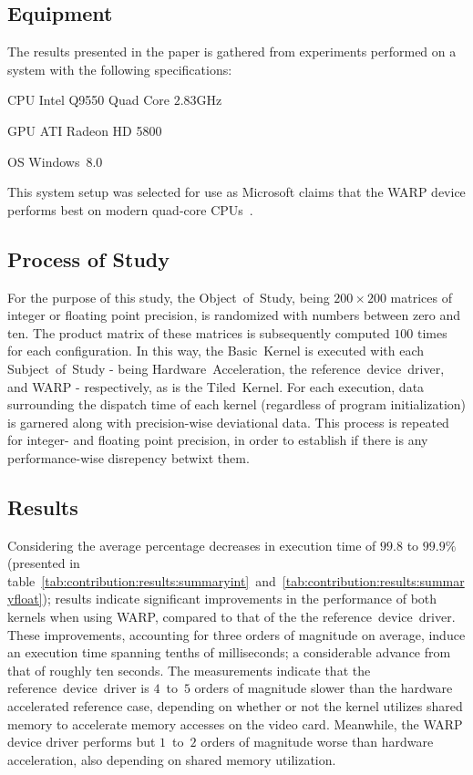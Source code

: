 \subsection{Equipment}
\label{sec:contribution:equipment}
The results presented in the paper is gathered from experiments performed on a system with the following specifications:
\begin{description*}
	\item[CPU] Intel Q9550 Quad Core $2.83$GHz
	\item[GPU] ATI Radeon HD 5800
	\item[OS\phantom{U}] Windows~8.0
\end{description*}
This system setup was selected for use as Microsoft claims that the WARP device performs best on modern quad-core CPUs~.

\subsection{Process of Study}
\label{sec:contribution:processofstudy}
For the purpose of this study, the Object~of~Study, being $200\times 200$ matrices of integer or floating point precision, is randomized with numbers between zero and ten.
The product matrix of these matrices is subsequently computed $100$ times for each configuration.
In this way, the Basic~Kernel is executed with each Subject~of~Study - being Hardware~Acceleration, the reference~device~driver, and WARP - respectively, as is the Tiled~Kernel.
For each execution, data surrounding the dispatch time of each kernel (regardless of program initialization) is garnered along with precision-wise deviational data.
This process is repeated for integer- and floating point precision, in order to establish if there is any performance-wise disrepency betwixt them.

\subsection{Results}
\label{sec:contribution:results}
Considering the average percentage decreases in execution time of $99.8$ to $99.9\%$ (presented in table~\ref{tab:contribution:results:summaryint}~and~\ref{tab:contribution:results:summaryfloat}); results indicate significant improvements in the performance of both kernels when using WARP, compared to that of the the reference~device~driver.
These improvements, accounting for three orders of magnitude on average, induce an execution time spanning tenths of milliseconds; a considerable advance from that of roughly ten seconds.
The measurements indicate that the reference~device~driver is $4$~to~$5$ orders of magnitude slower than the hardware accelerated reference case, depending on whether or not the kernel utilizes shared memory to accelerate memory accesses on the video card.
Meanwhile, the WARP device driver performs but $1$~to~$2$ orders of magnitude worse than hardware acceleration, also depending on shared memory utilization.

